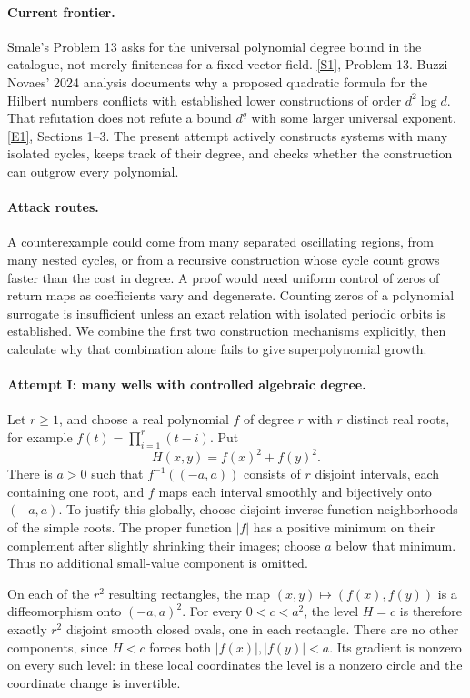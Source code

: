 \documentclass[11pt,a4paper]{article}
\newcommand{\sref}[2]{\hyperlink{source:#1:#2}{[S#2]}}
\newcommand{\eref}[2]{\hyperlink{extra:#1:#2}{[E#2]}}
\numberwithin{equation}{section}
\begin{document}
\paragraph{Current frontier.}
Smale's Problem 13 asks for the universal polynomial degree bound in the
catalogue, not merely finiteness for a fixed vector field.
\sref{125}{1}, Problem 13.
Buzzi--Novaes' 2024 analysis documents why a proposed quadratic formula
for the Hilbert numbers conflicts with established lower constructions
of order $d^2\log d$.  That refutation does not refute a bound $d^q$
with some larger universal exponent. \eref{125}{1}, Sections 1--3.
The present attempt actively constructs systems with many isolated
cycles, keeps track of their degree, and checks whether the construction
can outgrow every polynomial.

\paragraph{Attack routes.}
A counterexample could come from many separated oscillating regions,
from many nested cycles, or from a recursive construction whose cycle
count grows faster than the cost in degree.  A proof would need uniform
control of zeros of return maps as coefficients vary and degenerate.
Counting zeros of a polynomial surrogate is insufficient unless an exact
relation with isolated periodic orbits is established.  We combine the
first two construction mechanisms explicitly, then calculate why that
combination alone fails to give superpolynomial growth.

\paragraph{Attempt I: many wells with controlled algebraic degree.}
Let $r\geq1$, and choose a real polynomial $f$ of degree $r$ with $r$
distinct real roots, for example $f(t)=\prod_{i=1}^r(t-i)$.  Put
\[
 H(x,y)=f(x)^2+f(y)^2.
\]
There is $a>0$ such that $f^{-1}((-a,a))$ consists of $r$ disjoint
intervals, each containing one root, and $f$ maps each interval
smoothly and bijectively onto $(-a,a)$.  To justify this globally,
choose disjoint inverse-function neighborhoods of the simple roots.
The proper function $|f|$ has a positive minimum on their complement
after slightly shrinking their images; choose $a$ below that minimum.
Thus no additional small-value component is omitted.

On each of the $r^2$ resulting rectangles, the map
$(x,y)\mapsto(f(x),f(y))$ is a diffeomorphism onto $(-a,a)^2$.
For every $0<c<a^2$, the level $H=c$ is therefore exactly $r^2$
disjoint smooth closed ovals, one in each rectangle.  There are no other
components, since $H<c$ forces both $|f(x)|,|f(y)|<a$.  Its gradient
is nonzero on every such level: in these local coordinates the level
is a nonzero circle and the coordinate change is invertible.
\end{document}
